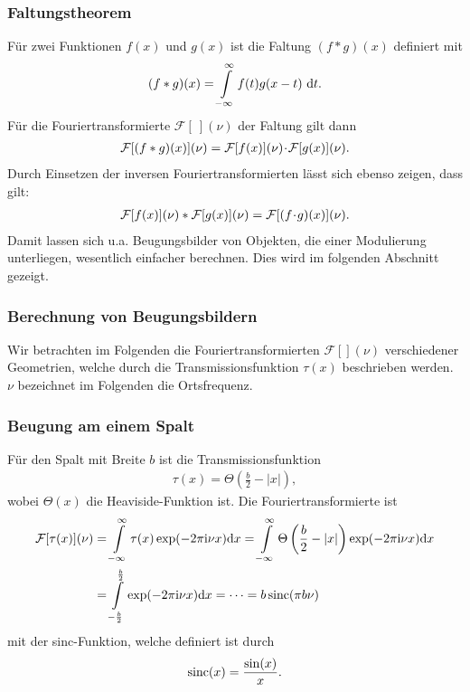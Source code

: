 \subsubsection{Faltungstheorem}
Für zwei Funktionen $f(x)$ und $g(x)$ ist die Faltung $(f*g)(x)$ definiert mit
\begin{align}
(f*g)(x)=\int\limits_{-\infty}^{\infty}f(t)g(x-t)~\mathrm{d} t.
\end{align}
Für die Fouriertransformierte $\mathcal{F}[~](\nu)$ der Faltung gilt dann
\begin{align}
\mathcal{F}[(f*g)(x)](\nu)=\mathcal{F}[f(x)](\nu)\!\cdot\! \mathcal{F}[g(x)](\nu).
\end{align}
Durch Einsetzen der inversen Fouriertransformierten lässt sich ebenso zeigen, dass gilt:
\begin{align}
\mathcal{F}[f(x)](\nu)* \mathcal{F}[g(x)](\nu)=\mathcal{F}[(f\!\cdot\! g)(x)](\nu).
\end{align}
Damit lassen sich u.a. Beugungsbilder von Objekten, die einer Modulierung unterliegen, wesentlich einfacher berechnen. Dies wird im folgenden Abschnitt gezeigt.
\subsubsection{Berechnung von Beugungsbildern}
Wir betrachten im Folgenden die Fouriertransformierten $\mathcal{F}[](\nu)$ verschiedener Geometrien, welche durch die Transmissionsfunktion $\tau(x)$ beschrieben werden.
$\nu$ bezeichnet im Folgenden die Ortsfrequenz.

\subsubsection*{Beugung am einem Spalt}

Für den Spalt mit Breite $b$ ist die Transmissionsfunktion
\begin{align}
\tau(x)=\Theta\left(\frac{b}{2}-|x|\right),
\end{align}
wobei $\Theta(x)$ die Heaviside-Funktion ist. Die Fouriertransformierte ist
\begin{align}
\mathcal{F}[\tau(x)](\nu)
&=\int\limits_{-\infty}^{\infty}\tau(x)\exp(-2\pi\mathrm{i}\nu x)\mathrm{d} x
 =\int\limits_{-\infty}^{\infty}\Theta\left(\frac{b}{2}-|x|\right)\exp(-2\pi\mathrm{i}\nu x)\mathrm{d} x\nonumber\\
&=\int\limits_{-\frac{b}{2}}^{\frac{b}{2}}\exp(-2\pi\mathrm{i}\nu x)\mathrm{d} x
 =\dots=b \operatorname{sinc}(\pi b\nu)
\label{eq:sinc}
\end{align}
mit der sinc-Funktion, welche definiert ist durch
\begin{align}
\operatorname{sinc}(x)=\frac{\sin(x)}{x}.
\end{align}

